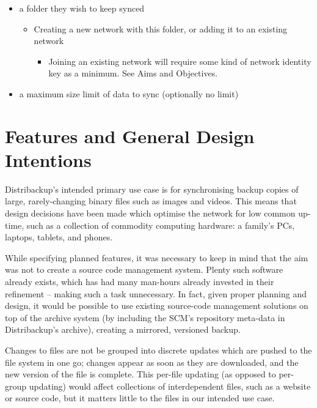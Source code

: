\documentclass[12pt,a4paper,]{adreport}
\begin{document}
\begin{itemize}
\itemsep1pt\parskip0pt
\item
  a folder they wish to keep synced

  \begin{itemize}
  \itemsep1pt\parskip0pt
  \item
    Creating a new network with this folder, or adding it to an existing
    network

    \begin{itemize}
    \itemsep1pt\parskip0pt
    \item
      Joining an existing network will require some kind of network
      identity key as a minimum. See Aims and Objectives.
    \end{itemize}
  \end{itemize}
\item
  a maximum size limit of data to sync (optionally no limit)
\end{itemize}

\section{Features and General Design
Intentions}\label{features-and-general-design-intentions}

Distribackup's intended primary use case is for synchronising backup
copies of large, rarely-changing binary files such as images and videos.
This means that design decisions have been made which optimise the
network for low common up-time, such as a collection of commodity
computing hardware: a family's PCs, laptops, tablets, and phones.

While specifying planned features, it was necessary to keep in mind that
the aim was not to create a source code management system. Plenty such
software already exists, which has had many man-hours already invested
in their refinement -- making such a task unnecessary. In fact, given
proper planning and design, it would be possible to use existing
source-code management solutions on top of the archive system (by
including the SCM's repository meta-data in Distribackup's archive),
creating a mirrored, versioned backup.

Changes to files are not be grouped into discrete updates which are
pushed to the file system in one go; changes appear as soon as they are
downloaded, and the new version of the file is complete. This per-file
updating (as opposed to per-group updating) would affect collections of
interdependent files, such as a website or source code, but it matters
little to the files in our intended use case.
\end{document}
